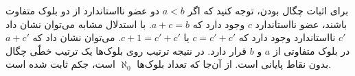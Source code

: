 \begin{ans}
  برای اثبات چگال بودن، توجه کنید که اگر $a < b$ دو عضو نااستاندارد از دو بلوک متفاوت باشند، عضو نااستاندارد $c$ وجود دارد که $a + c = b$. با استدلال مشابه می‌توان نشان داد $c'$ نااستاندارد وجود دارد که $c = c' + c'$ یا $c + 1 = c' + c'$. می‌توان نشان داد که $a + c'$ در بلوک متفاوتی از $a$ و $b$ قرار دارد. در نتیجه ترتیب روی بلوک‌ها یک ترتیب خطّی چگال بدون نقاط پایانی است. از آن‌جا که تعداد بلوک‌ها $\aleph_0$ است، جکم ثابت شده است.
\end{ans}